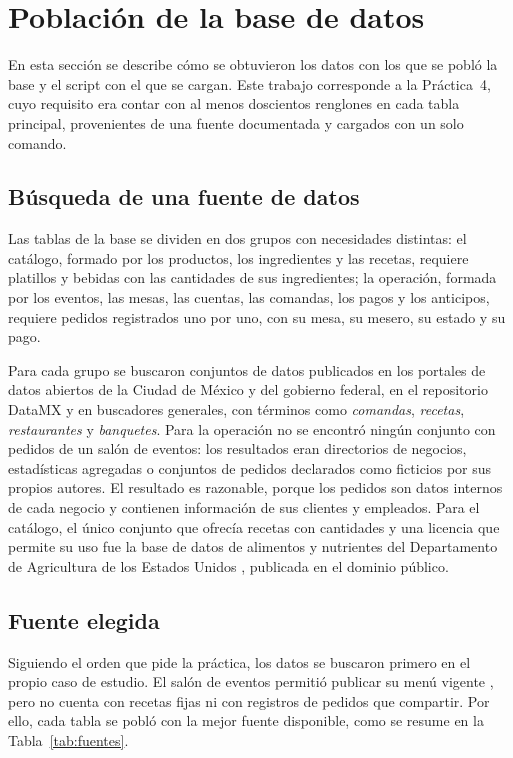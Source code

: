 \newpage

\section{Población de la base de datos}
\label{sec:poblacion}

En esta sección se describe cómo se obtuvieron los datos con los que se pobló la base y el script con el que se cargan. Este trabajo corresponde a la Práctica~4, cuyo requisito era contar con al menos doscientos renglones en cada tabla principal, provenientes de una fuente documentada y cargados con un solo comando.

\subsection{Búsqueda de una fuente de datos}

Las tablas de la base se dividen en dos grupos con necesidades distintas: el catálogo, formado por los productos, los ingredientes y las recetas, requiere platillos y bebidas con las cantidades de sus ingredientes; la operación, formada por los eventos, las mesas, las cuentas, las comandas, los pagos y los anticipos, requiere pedidos registrados uno por uno, con su mesa, su mesero, su estado y su pago.

Para cada grupo se buscaron conjuntos de datos publicados en los portales de datos abiertos de la Ciudad de México y del gobierno federal, en el repositorio DataMX y en buscadores generales, con términos como \textit{comandas}, \textit{recetas}, \textit{restaurantes} y \textit{banquetes}. Para la operación no se encontró ningún conjunto con pedidos de un salón de eventos: los resultados eran directorios de negocios, estadísticas agregadas o conjuntos de pedidos declarados como ficticios por sus propios autores. El resultado es razonable, porque los pedidos son datos internos de cada negocio y contienen información de sus clientes y empleados. Para el catálogo, el único conjunto que ofrecía recetas con cantidades y una licencia que permite su uso fue la base de datos de alimentos y nutrientes del Departamento de Agricultura de los Estados Unidos \parencite{usda_fndds}, publicada en el dominio público.

\subsection{Fuente elegida}

Siguiendo el orden que pide la práctica, los datos se buscaron primero en el propio caso de estudio. El salón de eventos permitió publicar su menú vigente \parencite{menu_salon}, pero no cuenta con recetas fijas ni con registros de pedidos que compartir. Por ello, cada tabla se pobló con la mejor fuente disponible, como se resume en la Tabla~\ref{tab:fuentes}.

